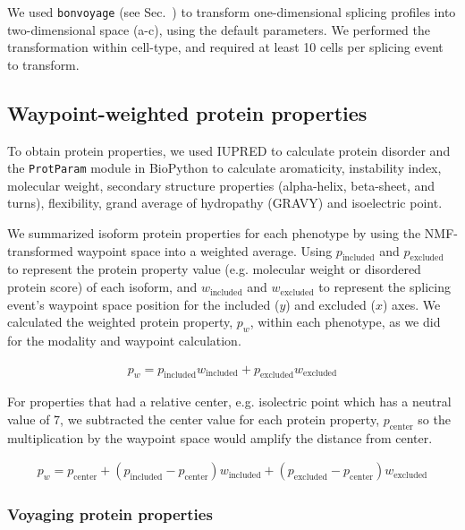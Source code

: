 We used \texttt{bonvoyage} (see Sec.~) to transform one-dimensional splicing profiles into two-dimensional space (a-c), using the default parameters. We performed the transformation within cell-type, and required at least 10 cells per splicing event to transform.

\subsection{Waypoint-weighted protein properties}

To obtain protein properties, we used IUPRED \cite{Dosztanyi:2005gq} to calculate protein disorder and the \texttt{ProtParam} module in BioPython \cite{Cock:2009hj} to calculate aromaticity, instability index, molecular weight, secondary structure properties (alpha-helix, beta-sheet, and turns), flexibility, grand average of hydropathy (GRAVY) and isoelectric point.



We summarized isoform protein properties for each phenotype by using the NMF-transformed waypoint space into a weighted average. Using $p_{\text{included}}$ and $p_{\text{excluded}}$ to represent the protein property value (e.g. molecular weight or disordered protein score) of each isoform, and $w_{\text{included}}$ and $w_{\text{excluded}}$ to represent the splicing event's waypoint space position for the included ($y$) and excluded ($x$) axes. We calculated the weighted protein property, $p_w$, within each phenotype, as we did for the modality and waypoint calculation.

\begin{align}
p_w = p_{\text{included}} w_{\text{included}} + p_{\text{excluded}} w_{\text{excluded}}
\end{align}

For properties that had a relative center, e.g. isolectric point which has a neutral value of 7, we subtracted the center value for each protein property, $p_{\text{center}}$ so the multiplication by the waypoint space would amplify the distance from center.

\begin{align}
p_w = p_{\text{center}} + (p_{\text{included}} - p_{\text{center}}) w_{\text{included}} + (p_{\text{excluded}} - p_{\text{center}}) w_{\text{excluded}}
\end{align}

\subsubsection{Voyaging protein properties}

